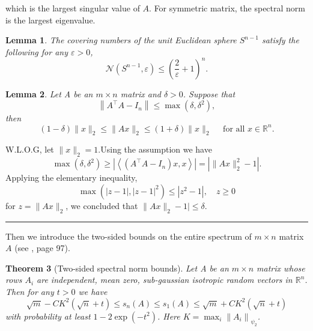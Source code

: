 \documentclass[12pt]{article}
\numberwithin{equation}{section}
\newtheorem{theorem}{Theorem}[section]
\newtheorem{lemma}[theorem]{Lemma}
\newenvironment{proof}{{\bf Proof:}}{\hfill\rule{2mm}{2mm}}
\begin{document}
which is the largest singular value of $A$. For symmetric matrix, the spectral norm is the largest eigenvalue. 
\begin{lemma}\label{lemma1.2}
	The covering numbers of the unit Euclidean sphere $S^{n-1}$ satisfy the following for any $\varepsilon>0$,
	$$
	\mathcal{N}\left(S^{n-1}, \varepsilon\right) \leq\left(\frac{2}{\varepsilon}+1\right)^{n}.
	$$
\end{lemma}
\begin{lemma}\label{lemma1.3}
	Let A be an $m\times n$ matrix and $\delta>0$. Suppose that
	$$
	\left\|A^{\top} A-I_{n}\right\| \leq \max \left(\delta, \delta^{2}\right),
	$$
	then 
	$$
	(1-\delta)\|x\|_{2} \leq\|A x\|_{2} \leq(1+\delta)\|x\|_{2} \quad \text { for all } x \in \mathbb{R}^{n}.
	$$
\end{lemma}
\begin{proof}
	W.L.O.G, let $\|x\|_2=1$.Using the assumption we have
	$$
	\max \left(\delta, \delta^{2}\right) \geq\left|\left\langle\left(A^{\top} A-I_{n}\right) x, x\right\rangle\right|=\left|\|A x\|_{2}^{2}-1\right|.
	$$
	Applying the elementary inequality,
	$$
	\max \left(|z-1|,|z-1|^{2}\right) \leq\left|z^{2}-1\right|, \quad z \geq 0
	$$
	for $z=\|A x\|_{2}$, we concluded that $\|A x\|_{2}-1 | \leq \delta$.
\end{proof}\newline
Then we introduce the two-sided bounds on the entire spectrum of $m\times n$ matrix $A$ (see \citet{vershynin2018high}, page 97).
\begin{theorem}[Two-sided spectral norm bounds]\label{theorem1.4}
	Let A be an $m\times n$ matrix whose rows $A_i$ are independent, mean zero, sub-gaussian isotropic random vectors in $\mathbb{R}^n$. Then for any $t>0$ we have
	\begin{equation}
	\sqrt{m}-C K^{2}(\sqrt{n}+t) \leq s_{n}(A) \leq s_{1}(A) \leq \sqrt{m}+C K^{2}(\sqrt{n}+t)
	\end{equation}
	with probability at least $1-2 \exp \left(-t^{2}\right)$. Here $K=\max _{i}\left\|A_{i}\right\|_{\psi_{2}}$.
\end{theorem}
\end{document}
